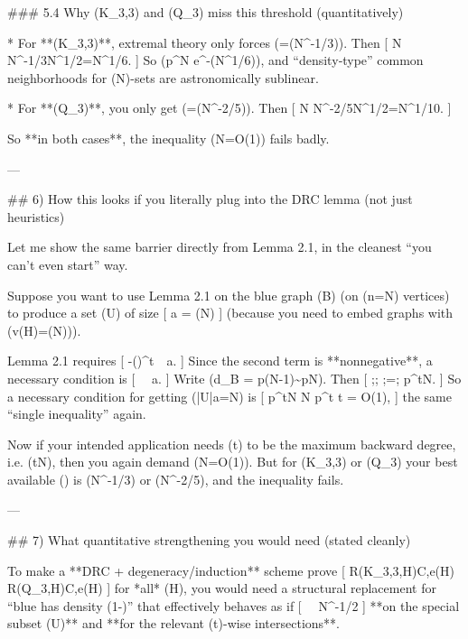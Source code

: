 ### 5.4 Why (K_{3,3}) and (Q_3) miss this threshold (quantitatively)

* For **(K_{3,3})**, extremal theory only forces (\varepsilon=\Theta(N^{-1/3})).
  Then
  [
  \varepsilon\sqrt N \asymp N^{-1/3}\cdot N^{1/2}=N^{1/6}\to\infty.
  ]
  So (p^{\sqrt N} \le e^{-\Theta(N^{1/6})}), and “density‑type” common neighborhoods for (\sqrt N)-sets are astronomically sublinear.

* For **(Q_3)**, you only get (\varepsilon=\Theta(N^{-2/5})).
  Then
  [
  \varepsilon\sqrt N \asymp N^{-2/5}\cdot N^{1/2}=N^{1/10}\to\infty.
  ]

So **in both cases**, the inequality (\varepsilon\sqrt N=O(1)) fails badly.

---

## 6) How this looks if you literally plug into the DRC lemma (not just heuristics)

Let me show the same barrier directly from Lemma 2.1, in the cleanest “you can’t even start” way.

Suppose you want to use Lemma 2.1 on the blue graph (B) (on (n=N) vertices) to produce a set (U) of size
[
a = \Theta(N)
]
(because you need to embed graphs with (v(H)=\Theta(N))).

Lemma 2.1 requires
[
-\left(\right)^{t}\ \ge\ a.
]
Since the second term is **nonnegative**, a necessary condition is
[
 \ \ge\ a.
]
Write (d_B = p(N-1)\sim pN). Then
[
;\le;
;=;
p^{t}N.
]
So a necessary condition for getting (|U|\ge a=\alpha N) is
[
p^{t}N \ge \alpha N
\quad\Longrightarrow\quad
p^{t}\ge \alpha
\quad\Longrightarrow\quad
\varepsilon t = O(1),
]
the same “single inequality” again.

Now if your intended application needs (t) to be the maximum backward degree, i.e. (t\asymp \sqrt N), then you again demand (\varepsilon\sqrt N=O(1)). But for (K_{3,3}) or (Q_3) your best available (\varepsilon) is (N^{-1/3}) or (N^{-2/5}), and the inequality fails.

---

## 7) What quantitative strengthening you would need (stated cleanly)

To make a **DRC + degeneracy/induction** scheme prove
[
R(K_{3,3},H)\le C,e(H)
\quad{}\quad
R(Q_3,H)\le C,e(H)
]
for *all* (H), you would need a structural replacement for “blue has density (1-\varepsilon)” that effectively behaves as if
[
\varepsilon \ \lesssim\ N^{-1/2}
]
**on the special subset (U)** and **for the relevant (t)-wise intersections**.

